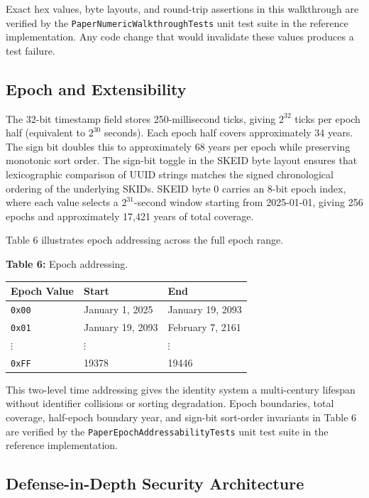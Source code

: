 \documentclass[fleqn,10pt,lineno]{wlpeerj}
\newcounter{none} %
\begin{document}
Exact hex values, byte layouts, and round-trip assertions in this
walkthrough are verified by the \texttt{PaperNumericWalkthroughTests}
unit test suite in the reference implementation. Any code change that
would invalidate these values produces a test failure.

\subsection{Epoch and Extensibility}\label{epoch-and-extensibility}

The 32-bit timestamp field stores 250-millisecond ticks, giving
\(2^{32}\) ticks per epoch half (equivalent to \(2^{30}\) seconds). Each
epoch half covers approximately 34 years. The sign bit doubles this to
approximately 68 years per epoch while preserving monotonic sort order.
The sign-bit toggle in the SKEID byte layout ensures that lexicographic
comparison of UUID strings matches the signed chronological ordering of
the underlying SKIDs. SKEID byte 0 carries an 8-bit epoch index, where
each value selects a \(2^{31}\)-second window starting from 2025-01-01,
giving 256 epochs and approximately 17,421 years of total coverage.

\newpage

Table 6 illustrates epoch addressing across the full epoch range.

\textbf{Table 6:} Epoch addressing.

{\def\LTcaptype{none} %
\begin{longtable}[]{@{}lll@{}}
\toprule\noalign{}
Epoch Value & Start & End \\
\midrule\noalign{}
\endhead
\bottomrule\noalign{}
\endlastfoot
\texttt{0x00} & January 1, 2025 & January 19, 2093 \\
\texttt{0x01} & January 19, 2093 & February 7, 2161 \\
\(\vdots\) & \(\vdots\) & \(\vdots\) \\
\texttt{0xFF} & 19378 & 19446 \\
\end{longtable}
}

This two-level time addressing gives the identity system a multi-century
lifespan without identifier collisions or sorting degradation. Epoch
boundaries, total coverage, half-epoch boundary year, and sign-bit
sort-order invariants in Table 6 are verified by the
\texttt{PaperEpochAddressabilityTests} unit test suite in the reference
implementation.

\subsection{Defense-in-Depth Security
Architecture}\label{defense-in-depth-security-architecture}
\end{document}
